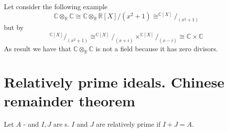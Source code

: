 Let consider the following example
\[
\mathbb{C} \otimes_\mathbb{R} \mathbb{C}
\cong
\mathbb{C} \otimes_\mathbb{R}
{\mathbb{R}\left[X\right]}/{\left(x^2 + 1\right)}
\cong
^{\mathbb{C}\left[X\right]}/_{\left(x^2 + 1\right)}
\]
but by 
\[
^{\mathbb{C}\left[X\right]}/_{\left(x^2 + 1\right)}
\cong
^{\mathbb{C}\left[X\right]}/_{\left(x + i\right)}
\times
^{\mathbb{C}\left[X\right]}/_{\left(x - i\right)}
\cong
\mathbb{C} \times \mathbb{C}
\]
As result we have that
$\mathbb{C} \otimes_\mathbb{R} \mathbb{C}$ is not a field because it
has zero divisors.


\section{Relatively prime ideals. Chinese remainder theorem}

\begin{definition}
  Let $A$ -  and $I,J$ are s.
  $I$ and $J$ are relatively prime if $I + J = A$.
  \label{def:relprimeideals}
\end{definition}

